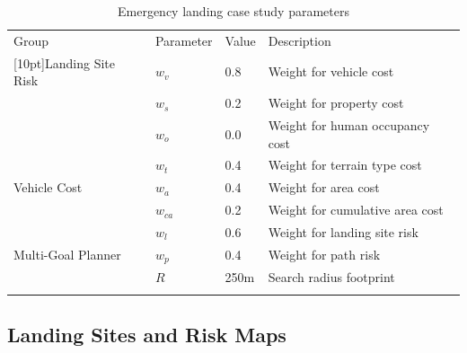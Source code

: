 \begin{table}[ht]
\centering
\caption[Emergency landing case study parameters]{Emergency landing case study parameters}
\label{table:ch5_weights}
\begin{tabular}{@{}llll@{}}
\hline\noalign{\smallskip}
Group                                           & Parameter    & Value                     & Description                \\ 
\noalign{\smallskip}\hline\noalign{\smallskip}
\multirow{3}{*}[10pt]{Landing Site Risk}        & $w_v$         & 0.8                       & Weight for vehicle cost    \\
                                                & $w_s$        & 0.2                       & Weight for property cost \\
                                                & $w_o$        & 0.0                       & Weight for human occupancy cost   \\
\multirow{3}{*}[10pt]{Vehicle Cost}        & $w_t$         & 0.4                       & Weight for terrain type cost    \\
                                                & $w_a$        & 0.4                       & Weight for area cost \\
                                                & $w_{ca}$        & 0.2                       & Weight for cumulative area cost   \\
\multirow{3}{*}[10pt]{Multi-Goal Planner}       & $w_l$        & 0.6                       & Weight for landing site risk    \\
                                                & $w_p$        & 0.4                       & Weight for path risk   \\
                                                & $R$        & 250m                       & Search radius footprint   \\
\noalign{\smallskip}\hline\noalign{\smallskip}
\end{tabular}
\end{table}

\subsection{Landing Sites and Risk Maps}\label{sec:ch5_generated_maps}

